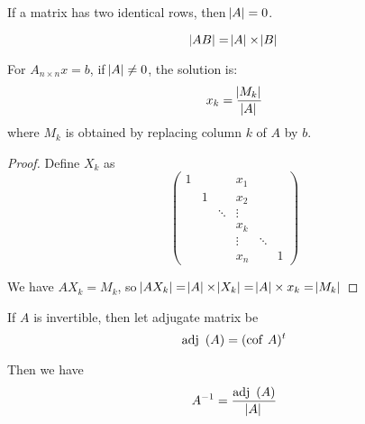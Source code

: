 \begin{theorem}
    If a matrix has two identical rows, then $\abs{A} = 0$.
\end{theorem}


\begin{theorem}
    \begin{equation}
        \abs{AB} = \abs{A} \times \abs{B}
    \end{equation}    
\end{theorem}


\begin{theorem}
    For $A_{n \times n}x=b$, if $\abs{A} \neq 0$, the solution is:
    \begin{equation}
        x_k = \frac{\abs{M_k}}{\abs{A}}
    \end{equation}
    where $M_k$ is obtained by replacing column $k$ of $A$ by $b$.
\end{theorem}
\begin{proof}
    Define $X_k$ as 
    \begin{equation*}
        \begin{pmatrix}
        1 &   &   & x_1 &  \\
          & 1 &   & x_2 &  \\
          &   & \ddots & \vdots \\
          &   &        &  x_k & \\
          &&& \vdots & \ddots \\
          &&& x_n & & 1          
        \end{pmatrix}
    \end{equation*}
    
    We have $A X_k = M_k$, so $\abs{A X_k} = \abs{A} \times \abs{X_k} = \abs{A} \times x_k = \abs{M_k}$
\end{proof}

\begin{theorem}
    If $A$ is invertible, then let adjugate matrix be
    \begin{equation}
        \displaystyle \mathrm{adj}~\left( A \right) = (\displaystyle \mathrm{cof}~\displaystyle A)^t
    \end{equation}
    
    Then we have
    \begin{equation}
        {A}^{-1} = \frac{\displaystyle \mathrm{adj}~\left( A \right)}{\abs{A}}
    \end{equation}    
\end{theorem}


